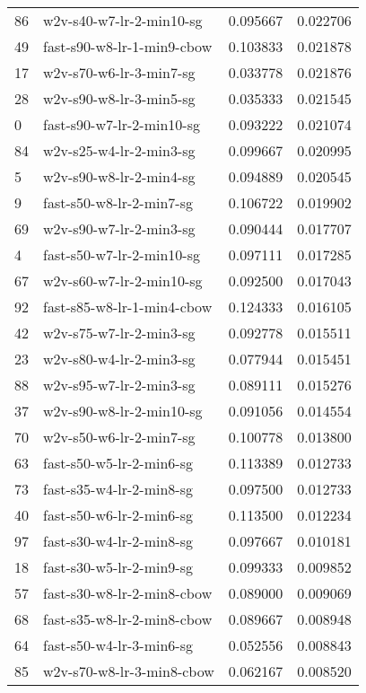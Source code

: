 {\begin{tabular}{llrr}
86 &     w2v-s40-w7-lr-2-min10-sg &  0.095667 &  0.022706 \\
49 &   fast-s90-w8-lr-1-min9-cbow &  0.103833 &  0.021878 \\
17 &      w2v-s70-w6-lr-3-min7-sg &  0.033778 &  0.021876 \\
28 &      w2v-s90-w8-lr-3-min5-sg &  0.035333 &  0.021545 \\
0  &    fast-s90-w7-lr-2-min10-sg &  0.093222 &  0.021074 \\
84 &      w2v-s25-w4-lr-2-min3-sg &  0.099667 &  0.020995 \\
5  &      w2v-s90-w8-lr-2-min4-sg &  0.094889 &  0.020545 \\
9  &     fast-s50-w8-lr-2-min7-sg &  0.106722 &  0.019902 \\
69 &      w2v-s90-w7-lr-2-min3-sg &  0.090444 &  0.017707 \\
4  &    fast-s50-w7-lr-2-min10-sg &  0.097111 &  0.017285 \\
67 &     w2v-s60-w7-lr-2-min10-sg &  0.092500 &  0.017043 \\
92 &   fast-s85-w8-lr-1-min4-cbow &  0.124333 &  0.016105 \\
42 &      w2v-s75-w7-lr-2-min3-sg &  0.092778 &  0.015511 \\
23 &      w2v-s80-w4-lr-2-min3-sg &  0.077944 &  0.015451 \\
88 &      w2v-s95-w7-lr-2-min3-sg &  0.089111 &  0.015276 \\
37 &     w2v-s90-w8-lr-2-min10-sg &  0.091056 &  0.014554 \\
70 &      w2v-s50-w6-lr-2-min7-sg &  0.100778 &  0.013800 \\
63 &     fast-s50-w5-lr-2-min6-sg &  0.113389 &  0.012733 \\
73 &     fast-s35-w4-lr-2-min8-sg &  0.097500 &  0.012733 \\
40 &     fast-s50-w6-lr-2-min6-sg &  0.113500 &  0.012234 \\
97 &     fast-s30-w4-lr-2-min8-sg &  0.097667 &  0.010181 \\
18 &     fast-s30-w5-lr-2-min9-sg &  0.099333 &  0.009852 \\
57 &   fast-s30-w8-lr-2-min8-cbow &  0.089000 &  0.009069 \\
68 &   fast-s35-w8-lr-2-min8-cbow &  0.089667 &  0.008948 \\
64 &     fast-s50-w4-lr-3-min6-sg &  0.052556 &  0.008843 \\
85 &    w2v-s70-w8-lr-3-min8-cbow &  0.062167 &  0.008520 \\

\end{tabular}}
